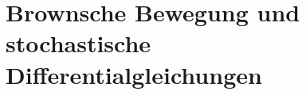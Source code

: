 %
%
%
%

\chapter{Brownsche Bewegung und stochastische Differentialgleichungen\label{chapter:brown}}


% 

\begin{refsection}






\printbibliography[heading=subbibliography]

\end{refsection}

